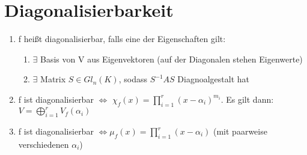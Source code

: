 \section{Diagonalisierbarkeit}
\begin{enumerate}
	\item f heißt diagonalisierbar, falls eine der Eigenschaften gilt:
	\begin{enumerate}
		\item $\exists$ Basis von V aus Eigenvektoren (auf der Diagonalen stehen Eigenwerte)
		\item $\exists$ Matrix $S \in Gl_n(K)$, sodass $S^{-1}AS$ Diagnoalgestalt hat
	\end{enumerate}
	\item f ist diagonalisierbar $\Leftrightarrow$ $\chi_f(x) = \prod \limits_{i=1}^{r} (x- \alpha_i)^{m_i}$. Es gilt dann: $V=\bigoplus \limits_{i=1}^r V_f(\alpha_i)$
	\item f ist diagonalisierbar $\Leftrightarrow \mu_f(x) = \prod \limits_{i=1}^{r}(x-\alpha_i)$ (mit paarweise verschiedenen $\alpha_i$) 
\end{enumerate}

